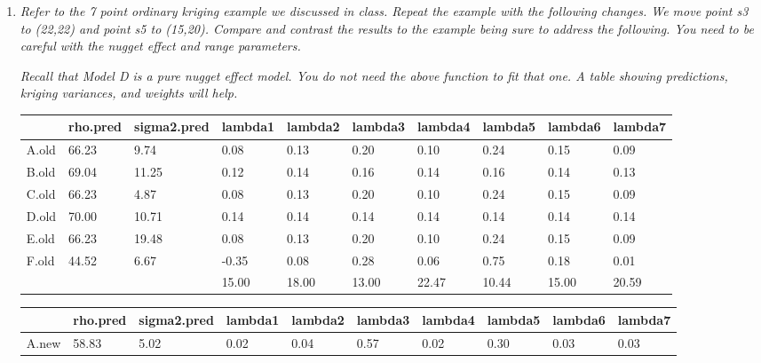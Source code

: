 \documentclass{article}\usepackage[]{graphicx}\usepackage[]{color}
\begin{document}
\begin{enumerate}
\item %
{\it Refer to the 7 point ordinary kriging example we discussed in class. Repeat the example with the following changes. We move point s3 to (22,22) and point s5 to (15,20). Compare and contrast the results to the example being sure to address the following. You need to be careful with the nugget effect and range parameters.}

{\it Recall that Model D is a pure nugget effect model. You do not need the above function to fit that one. A table showing predictions, kriging variances, and weights will help.}







\begin{table}[ht]
\centering
\begin{tabular}{||l|l|l|l|l|l|l|l|l|l||}
  \hline
 & rho.pred & sigma2.pred & lambda1 & lambda2 & lambda3 & lambda4 & lambda5 & lambda6 & lambda7 \\ 
  \hline
A.old & 66.23 & 9.74 & 0.08 & 0.13 & 0.20 & 0.10 & 0.24 & 0.15 & 0.09 \\ 
  B.old & 69.04 & 11.25 & 0.12 & 0.14 & 0.16 & 0.14 & 0.16 & 0.14 & 0.13 \\ 
  C.old & 66.23 & 4.87 & 0.08 & 0.13 & 0.20 & 0.10 & 0.24 & 0.15 & 0.09 \\ 
  D.old & 70.00 & 10.71 & 0.14 & 0.14 & 0.14 & 0.14 & 0.14 & 0.14 & 0.14 \\ 
  E.old & 66.23 & 19.48 & 0.08 & 0.13 & 0.20 & 0.10 & 0.24 & 0.15 & 0.09 \\ 
  F.old & 44.52 & 6.67 & -0.35 & 0.08 & 0.28 & 0.06 & 0.75 & 0.18 & 0.01 \\ 
   &  &  & 15.00 & 18.00 & 13.00 & 22.47 & 10.44 & 15.00 & 20.59 \\ 
   \hline
\end{tabular}
\end{table}
\begin{table}[ht]
\centering
\begin{tabular}{||l|l|l|l|l|l|l|l|l|l||}
  \hline
 & rho.pred & sigma2.pred & lambda1 & lambda2 & lambda3 & lambda4 & lambda5 & lambda6 & lambda7 \\ 
  \hline
A.new & 58.83 & 5.02 & 0.02 & 0.04 & 0.57 & 0.02 & 0.30 & 0.03 & 0.03 \\ 

\end{tabular}
\end{table}
\end{enumerate}
\end{document}
